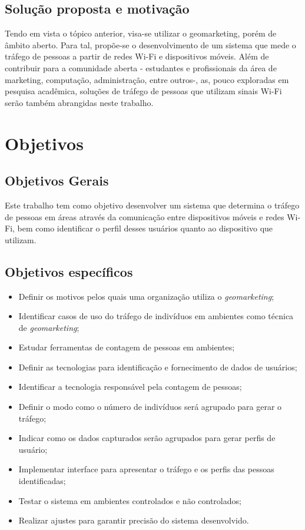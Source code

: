 \subsection{Solução proposta e motivação}
Tendo em vista o tópico anterior, visa-se utilizar o geomarketing, porém de
âmbito aberto. Para tal, propõe-se o desenvolvimento de um sistema que mede o
tráfego de pessoas a partir de redes Wi-Fi e dispositivos móveis. Além de
contribuir para a comunidade aberta - estudantes e profissionais da área de
marketing, computação, administração, entre outros-, as, pouco exploradas em
pesquisa acadêmica, soluções de tráfego de pessoas que utilizam sinais Wi-Fi
serão também abrangidas neste trabalho.

\section{Objetivos}
\label{objetivos}

\subsection{Objetivos Gerais}
Este trabalho tem como objetivo desenvolver um sistema que determina o tráfego de pessoas em áreas através da comunicação
entre dispositivos móveis e redes Wi-Fi, bem como identificar o perfil desses usuários quanto ao dispositivo que utilizam.

\subsection{Objetivos específicos}
\begin{itemize}
  \item Definir os motivos pelos quais uma organização utiliza o \emph{geomarketing};
  \item Identificar casos de uso do tráfego de indivíduos em ambientes como técnica
  de \emph{geomarketing};
  \item Estudar ferramentas de contagem de pessoas em ambientes;
  \item Definir as tecnologias para identificação e fornecimento de dados de usuários;
  \item Identificar a tecnologia responsável pela contagem de pessoas;
  \item Definir o modo como o número de indivíduos será agrupado para gerar o tráfego;
  \item Indicar como os dados capturados serão agrupados para gerar perfis de usuário;
  \item Implementar interface para apresentar o tráfego e os perfis das pessoas identificadas;
  \item Testar o sistema em ambientes controlados e não controlados;
  \item Realizar ajustes para garantir precisão do sistema desenvolvido.
\end{itemize}

